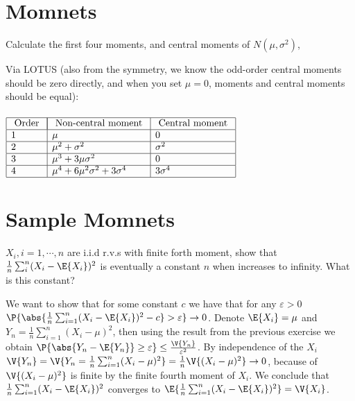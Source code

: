 \section{Momnets}
\label{sec:section-6.2}

\begin{exercise}\label{ex:chap06:02-1}
 Calculate the first four moments, and central moments of $N(\mu,\sigma^2)$,
	\begin{solution}
		Via LOTUS (also from the symmetry, we know the odd-order central moments should be zero directly, and when you set $\mu=0$, moments and central moments should be equal):~\\~\\		
		$\begin{array}{|l|l|l|}
			\hline \text { Order } & \multicolumn{1}{|c|}{\text { Non-central moment }} & \text { Central moment } \\
			\hline 1 & \mu & 0 \\
			\hline 2 & \mu^2+\sigma^2 & \sigma^2 \\
			\hline 3 & \mu^3+3 \mu \sigma^2 & 0 \\
			\hline 4 & \mu^4+6 \mu^2 \sigma^2+3 \sigma^4 & 3 \sigma^4 \\
			\hline
		\end{array}$~\\
	\end{solution}
\end{exercise}



\section{Sample Momnets}
\label{sec:section-6.3}

	\begin{exercise}\label{ex:chap06:06}
$X_i, i=1,\cdots, n$ are i.i.d r.v.s with finite forth moment, show that $\frac{1}{n}\sum_i^n (X_i-\E{X_i})^2$ is eventually a constant $n$ when increases to infinity. What is this constant?
	\begin{solution}
		We want to show that for some constant $c$ we have that for any $\varepsilon>0$ $\P{\abs{\frac{1}{n}\sum_{i=1}^n(X_{i}-\E{X_i})^2-c}>\varepsilon}\rightarrow 0$. Denote $\E{X_i}=\mu$ and $Y_n=\frac{1}{n}\sum_{i=1}^n(X_{i}-\mu)^2$, then using the result from the previous exercise we obtain $\P{\abs{Y_n-\E{Y_n}}\geq\varepsilon}\leq \frac{\V{Y_n}}{\varepsilon^2}$. By independence of the $X_i$ $\V{Y_n}=\V{Y_n=\frac{1}{n}\sum_{i=1}^n(X_{i}-\mu)^2}=\frac{1}{n}\V{(X_i-\mu)^2}\rightarrow 0$, because of $\V{(X_i-\mu)^2}$ is finite by the finite fourth moment of $X_i$. We conclude that $\frac{1}{n}\sum_{i=1}^n(X_{i}-\E{X_i})^2$ converges to $\E{\frac{1}{n}\sum_{i=1}^n(X_{i}-\E{X_i})^2}=\V{X_i}$.
	\end{solution}
\end{exercise}


